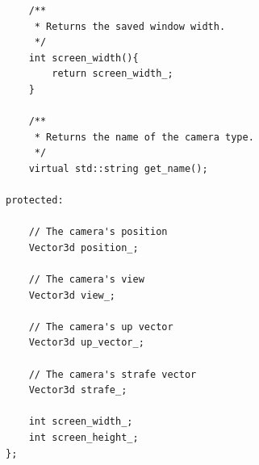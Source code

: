 \begin{appendix}
\begin{lstlisting}
	/**
	 * Returns the saved window width.
	 */
	int screen_width(){
		return screen_width_;
	}

	/**
	 * Returns the name of the camera type.
	 */
	virtual std::string get_name();

protected:

	// The camera's position
	Vector3d position_;

	// The camera's view
	Vector3d view_;

	// The camera's up vector
	Vector3d up_vector_;

	// The camera's strafe vector
	Vector3d strafe_;

	int screen_width_;
	int screen_height_;
};
\end{lstlisting}
\end{appendix}

